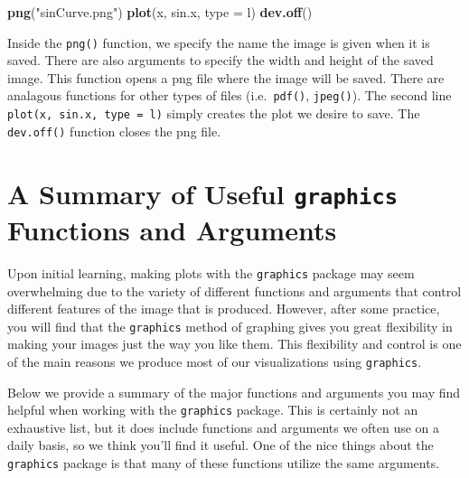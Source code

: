 \documentclass[
]{krantz}
\makeatletter
\newenvironment{Shaded}{\begin{snugshade}}{\end{snugshade}}
\newcommand{\DataTypeTok}[1]{\textcolor[rgb]{0.27,0.27,0.27}{#1}}
\newcommand{\KeywordTok}[1]{\textcolor[rgb]{0.27,0.27,0.27}{\textbf{#1}}}
\newcommand{\NormalTok}[1]{#1}
\newcommand{\StringTok}[1]{\textcolor[rgb]{0.5,0.5,0.5}{#1}}
\newenvironment{kframe}{%
\medskip{}
\setlength{\fboxsep}{.8em}
 \def\at@end@of@kframe{}%
 \ifinner\ifhmode%
  \def\at@end@of@kframe{\end{minipage}}%
  \begin{minipage}{\columnwidth}%
 \fi\fi%
 \def\FrameCommand##1{\hskip\@totalleftmargin \hskip-\fboxsep
 \colorbox{shadecolor}{##1}\hskip-\fboxsep
     \hskip-\linewidth \hskip-\@totalleftmargin \hskip\columnwidth}%
 \MakeFramed {\advance\hsize-\width
   \@totalleftmargin\z@ \linewidth\hsize
   \@setminipage}}%
 {\par\unskip\endMakeFramed%
 \at@end@of@kframe}
\renewenvironment{Shaded}{\begin{kframe}}{\end{kframe}}
\makeatother
\begin{document}
\begin{Shaded}
\begin{Highlighting}[]
\KeywordTok{png}\NormalTok{(}\StringTok{"sinCurve.png"}\NormalTok{)}
\KeywordTok{plot}\NormalTok{(x, sin.x, }\DataTypeTok{type =} \StringTok{\textquotesingle{}l\textquotesingle{}}\NormalTok{)}
\KeywordTok{dev.off}\NormalTok{()}
\end{Highlighting}
\end{Shaded}

Inside the \texttt{png()} function, we specify the name the image is given when it is saved. There are also arguments to specify the width and height of the saved image. This function opens a png file where the image will be saved. There are analagous functions for other types of files (i.e.~\texttt{pdf()}, \texttt{jpeg()}). The second line \texttt{plot(x,\ sin.x,\ type\ =\ \textquotesingle{}l\textquotesingle{})} simply creates the plot we desire to save. The \texttt{dev.off()} function closes the png file.

\hypertarget{graphics13}{%
\section{\texorpdfstring{A Summary of Useful \texttt{graphics} Functions and Arguments}{A Summary of Useful graphics Functions and Arguments}}\label{graphics13}}

Upon initial learning, making plots with the \texttt{graphics} package may seem overwhelming due to the variety of different functions and arguments that control different features of the image that is produced. However, after some practice, you will find that the \texttt{graphics} method of graphing gives you great flexibility in making your images just the way you like them. This flexibility and control is one of the main reasons we produce most of our visualizations using \texttt{graphics}.

Below we provide a summary of the major functions and arguments you may find helpful when working with the \texttt{graphics} package. This is certainly not an exhaustive list, but it does include functions and arguments we often use on a daily basis, so we think you'll find it useful. One of the nice things about the \texttt{graphics} package is that many of these functions utilize the same arguments.
\end{document}
